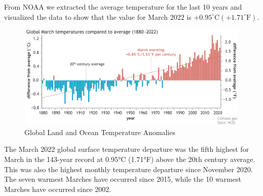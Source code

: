 \documentclass{apmcmthesis}
\begin{document}
From NOAA\cite{bib:one} we extracted the average temperature for the last 10 years and visualized the data to show that the value for March 2022 is $+0.95^{\circ} \mathrm{C}\left(+1.71^{\circ} \mathrm{F}\right)$.
\begin{figure}
    \centering
    \includegraphics[width=13cm,height=5cm]{APMCMThesis/figures/Global_March2022_tempanom_graph.png}
    \caption{Global Land and Ocean Temperature Anomalies}
    \label{fig2}
\end{figure}

The March 2022 global surface temperature\cite{fig2} departure was the fifth highest for March in the 143-year record at 0.95°C (1.71°F) above the 20th century average. This was also the highest monthly temperature departure since November 2020. The seven warmest Marches have occurred since 2015, while the 10 warmest Marches have occurred since 2002. 

\end{document}
